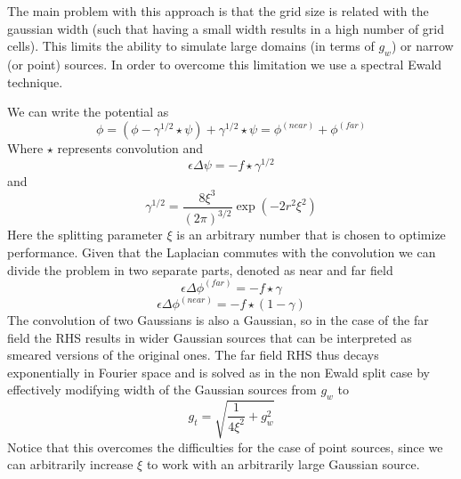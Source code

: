 \documentclass[ twoside,openright,titlepage,numbers=noenddot,%
headinclude,footinclude,cleardoublepage=empty,abstract=on,
BCOR=5mm,paper=a4,fontsize=11pt
]{scrreprt}
\begin{document}
The main problem with this approach is that the grid size is related with the gaussian width (such that having a small width results in a high number of grid cells). This limits the ability to simulate large domains (in terms of $g_w$) or narrow (or point) sources. In order to overcome this limitation we use a spectral Ewald technique.

We can write the potential as  
\begin{equation}
 \phi=(\phi - \gamma^{1/2}\star\psi) + \gamma^{1/2}\star\psi = \phi^{(near)} + \phi^{(far)}
\end{equation}  
Where  $\star$ represents convolution and
 \begin{equation}
 \epsilon\Delta\psi=-f\star\gamma^{1/2}
\end{equation}   
and  
 \begin{equation}
 \gamma^{1/2} = \frac{8\xi^3}{(2\pi)^{3/2}}\exp\left(-2r^2\xi^2\right)
\end{equation}   
Here the splitting parameter $\xi$ is an arbitrary number that is chosen to optimize performance. 
Given that the Laplacian commutes with the convolution we can divide the problem in two separate parts, denoted as near and far field  
 \begin{equation}
 \epsilon\Delta\phi^{(far)}=-f\star\gamma
\end{equation}   
\begin{equation}
 \label{tppoisson_ewald_near}
 \epsilon\Delta\phi^{(near)}=-f\star(1-\gamma)
\end{equation}   
The convolution of two Gaussians is also a Gaussian, so in the case of the far field the RHS results in wider Gaussian sources that can be interpreted as smeared versions of the original ones. The far field RHS thus decays exponentially in Fourier space and is solved as in the non Ewald split case by effectively modifying width of the Gaussian sources from $g_w$ to
\begin{equation}
  g_t = \sqrt{\frac{1}{4\xi^2} + g_w^2}
\end{equation}
Notice that this overcomes the difficulties for the case of point sources, since we can arbitrarily increase $\xi$ to work with an arbitrarily large Gaussian source.
\end{document}
